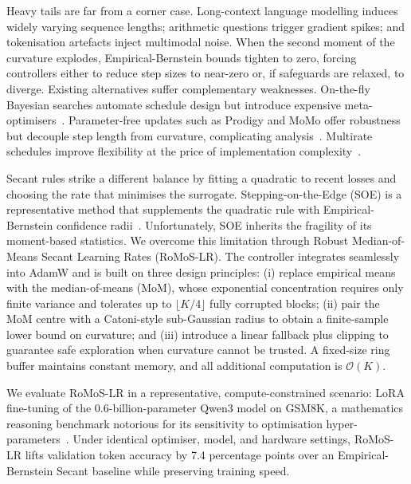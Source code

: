 \documentclass{article} %
\begin{document}
Heavy tails are far from a corner case. Long-context language modelling induces widely varying sequence lengths; arithmetic questions trigger gradient spikes; and tokenisation artefacts inject multimodal noise. When the second moment of the curvature explodes, Empirical-Bernstein bounds tighten to zero, forcing controllers either to reduce step sizes to near-zero or, if safeguards are relaxed, to diverge. Existing alternatives suffer complementary weaknesses. On-the-fly Bayesian searches automate schedule design but introduce expensive meta-optimisers~\cite{author-year-bayesian,author-year-autolrs}. Parameter-free updates such as Prodigy and MoMo offer robustness but decouple step length from curvature, complicating analysis~\cite{author-year-prodigy,author-year-momo}. Multirate schedules improve flexibility at the price of implementation complexity~\cite{author-year-multirate}.

Secant rules strike a different balance by fitting a quadratic to recent losses and choosing the rate that minimises the surrogate. Stepping-on-the-Edge (SOE) is a representative method that supplements the quadratic rule with Empirical-Bernstein confidence radii~\cite{author-year-stepping}. Unfortunately, SOE inherits the fragility of its moment-based statistics. We overcome this limitation through Robust Median-of-Means Secant Learning Rates (RoMoS-LR). The controller integrates seamlessly into AdamW and is built on three design principles: (i) replace empirical means with the median-of-means (MoM), whose exponential concentration requires only finite variance and tolerates up to \(\lfloor K/4 \rfloor\) fully corrupted blocks; (ii) pair the MoM centre with a Catoni-style sub-Gaussian radius to obtain a finite-sample lower bound on curvature; and (iii) introduce a linear fallback plus clipping to guarantee safe exploration when curvature cannot be trusted. A fixed-size ring buffer maintains constant memory, and all additional computation is \(\mathcal{O}(K)\).

We evaluate RoMoS-LR in a representative, compute-constrained scenario: LoRA fine-tuning of the 0.6-billion-parameter Qwen3 model on GSM8K, a mathematics reasoning benchmark notorious for its sensitivity to optimisation hyper-parameters~\cite{author-year-careful,author-year-language}. Under identical optimiser, model, and hardware settings, RoMoS-LR lifts validation token accuracy by 7.4 percentage points over an Empirical-Bernstein Secant baseline while preserving training speed.
\end{document}
